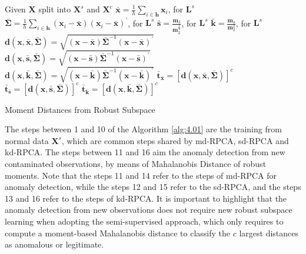 \begin{algorithm}
	\label{alg:4.01}
	\SetAlgoLined
	Given $\pmb{X}$ split into $\pmb{X}^s$ and $\pmb{X}^c$\;
	$\bar{\pmb{x}} = \displaystyle\frac{1}{h}\displaystyle\sum_{i\in \pmb{h}} \pmb{x}_i$, for $\pmb{L}^s$\;
	$\bar{\pmb{\Sigma}} = \displaystyle\frac{1}{h}\displaystyle\sum_{i\in \pmb{h}} (\pmb{x}_i - \bar{\pmb{x}})(\pmb{x}_i - \bar{\pmb{x}})^\prime$, for $\pmb{L}^s$\;
	$\bar{\pmb{s}} = \frac{\pmb{m}_3}{\pmb{m}_2^{\frac{3}{2}}}$, for $\pmb{L}^s$\;
	$\bar{\pmb{k}} = \frac{\pmb{m}_4}{\pmb{m}_2^2}$, for $\pmb{L}^s$\;
	$\pmb{d}(\pmb{x},\bar{\pmb{x}}, \bar{\pmb{\Sigma}}) = \sqrt{(\pmb{x} - \bar{\pmb{x}}) \bar{\pmb{\Sigma}}^{-1}(\pmb{x} - \bar{\pmb{x}})^\prime}$\;
	$\pmb{d}(\pmb{x}, \bar{\pmb{s}}, \bar{\pmb{\Sigma}}) = \sqrt{(\pmb{x} - \bar{\pmb{s}}) \bar{\pmb{\Sigma}}^{-1}(\pmb{x} - \bar{\pmb{s}})^\prime}$\;
	$\pmb{d}(\pmb{x}, \bar{\pmb{k}}, \bar{\pmb{\Sigma}}) = \sqrt{(\pmb{x} - \bar{\pmb{k}}) \bar{\pmb{\Sigma}}^{-1}(\pmb{x} - \bar{\pmb{k}})^\prime}$\;
	$\bar{\pmb{t}}_{\bar{\pmb{x}}} = [\pmb{d}(\pmb{x}, \bar{\pmb{x}}, \bar{\pmb{\Sigma}})]^c$\;
	$\bar{\pmb{t}}_{\bar{\pmb{s}}} = [\pmb{d}(\pmb{x}, \bar{\pmb{s}}, \bar{\pmb{\Sigma}})]^c$\;
	$\bar{\pmb{t}}_{\bar{\pmb{k}}} = [\pmb{d}(\pmb{x}, \bar{\pmb{k}}, \bar{\pmb{\Sigma}})]^c$\;
	\caption{Moment Distances from Robust Subspace}
\end{algorithm}

The steps between 1 and 10 of the Algorithm \ref{alg:4.01} are the training from normal data $\pmb{X}^s$, which are common steps shared by md-RPCA, sd-RPCA and kd-RPCA. The steps between 11 and 16 aim the anomaly detection from new contaminated observations, by means of Mahalanobis Distance of robust moments. Note that the steps 11 and 14 refer to the steps of md-RPCA for anomaly detection, while the steps 12 and 15 refer to the sd-RPCA, and the steps 13 and 16 refer to the steps of kd-RPCA. It is important to highlight that the anomaly detection from new observations does not require new robust subspace learning when adopting the semi-supervised approach, which only requires to compute a moment-based Mahalanobis distance to classify the $c$ largest distances as anomalous or legitimate.

